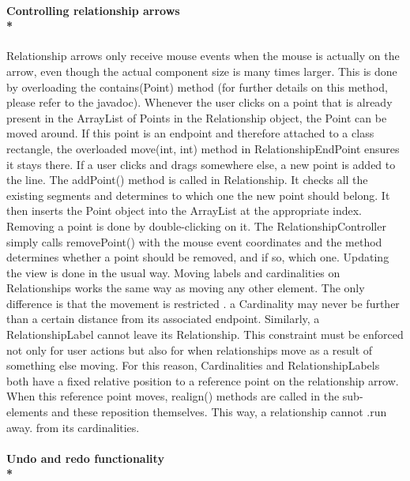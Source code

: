 \paragraph{\small{\tab Controlling relationship arrows\\*}}

\hspace{-10pt} Relationship arrows only receive mouse events when the mouse is actually on the arrow, even though the actual component size is many times larger. This is done by overloading the contains(Point) method (for further details on this method, please refer to the javadoc). Whenever the user clicks on a point that is already present in the ArrayList of Points in the Relationship object, the Point can be moved around. If this point is an endpoint and therefore attached to a class rectangle, the overloaded move(int, int) method in RelationshipEndPoint ensures it stays there. If a user clicks and drags somewhere else, a new point is added to the line. The addPoint() method is called in Relationship. It checks all the existing segments and determines to which one the new point should belong. It then inserts the Point object into the ArrayList at the appropriate index. Removing a point is done by double-clicking on it. The RelationshipController simply calls removePoint() with the mouse event coordinates and the method determines whether a point should be removed, and if so, which one. Updating the view is done in the usual way.
Moving labels and cardinalities on Relationships works the same way as moving any other element. The only difference is that the movement is restricted . a Cardinality may never be further than a certain distance from its associated endpoint. Similarly, a RelationshipLabel cannot leave its Relationship. This constraint must be enforced not only for user actions but also for when relationships move as a result of something else moving. For this reason, Cardinalities and RelationshipLabels both have a fixed relative position to a reference point on the relationship arrow. When this reference point moves, realign() methods are called in the sub-elements and these reposition themselves. This way, a relationship cannot .run away. from its cardinalities.

\vspace{-5pt}\paragraph{\small{\tab Undo and redo functionality\\*}}

